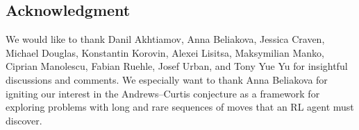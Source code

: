 
\subsection*{Acknowledgment}

We would like to thank Danil Akhtiamov, Anna Beliakova, Jessica Craven, Michael Douglas, Konstantin Korovin, Alexei Lisitsa, Maksymilian Manko, Ciprian Manolescu, Fabian Ruehle, Josef Urban, and Tony Yue Yu for insightful discussions and comments. We especially want to thank Anna Beliakova for igniting our interest in the Andrews--Curtis conjecture as a framework for exploring problems with long and rare sequences of moves that an RL agent must discover.